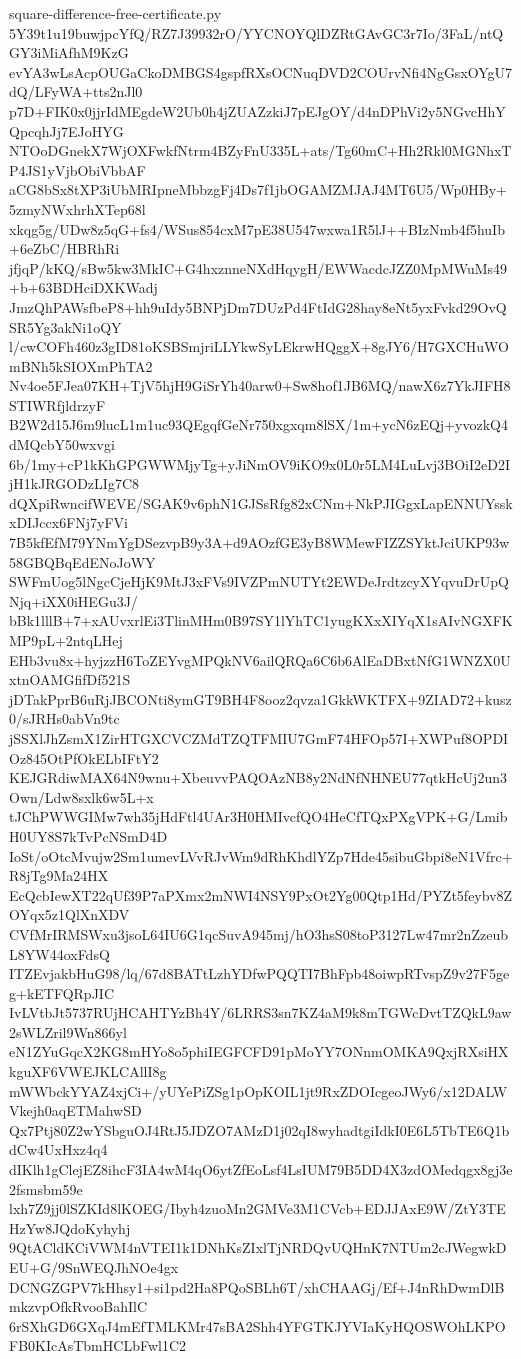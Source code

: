 \documentclass[11pt]{article}
\theoremstyle{definition}
\theoremstyle{remark}
\begin{document}
\begin{filecontents*}[overwrite]{square-difference-free-certificate.py}
5Y39t1u19buwjpcYfQ/RZ7J39932rO/YYCNOYQlDZRtGAvGC3r7Io/3FaL/ntQGY3iMiAfhM9KzG
evYA3wLsAcpOUGaCkoDMBGS4gspfRXsOCNuqDVD2COUrvNfi4NgGsxOYgU7dQ/LFyWA+tts2nJl0
p7D+FIK0x0jjrIdMEgdeW2Ub0h4jZUAZzkiJ7pEJgOY/d4nDPhVi2y5NGvcHhYQpcqhJj7EJoHYG
NTOoDGnekX7WjOXFwkfNtrm4BZyFnU335L+ats/Tg60mC+Hh2Rkl0MGNhxTP4JS1yVjbObiVbbAF
aCG8bSx8tXP3iUbMRIpneMbbzgFj4Ds7f1jbOGAMZMJAJ4MT6U5/Wp0HBy+5zmyNWxhrhXTep68l
xkqg5g/UDw8z5qG+fs4/WSus854cxM7pE38U547wxwa1R5lJ++BIzNmb4f5huIb+6eZbC/HBRhRi
jfjqP/kKQ/sBw5kw3MkIC+G4hxznneNXdHqygH/EWWacdcJZZ0MpMWuMs49+b+63BDHciDXKWadj
JmzQhPAWsfbeP8+hh9uIdy5BNPjDm7DUzPd4FtIdG28hay8eNt5yxFvkd29OvQSR5Yg3akNi1oQY
l/cwCOFh460z3gID81oKSBSmjriLLYkwSyLEkrwHQggX+8gJY6/H7GXCHuWOmBNh5kSIOXmPhTA2
Nv4oe5FJea07KH+TjV5hjH9GiSrYh40arw0+Sw8hof1JB6MQ/nawX6z7YkJIFH8STIWRfjldrzyF
B2W2d15J6m9lucL1m1uc93QEgqfGeNr750xgxqm8lSX/1m+ycN6zEQj+yvozkQ4dMQcbY50wxvgi
6b/1my+cP1kKhGPGWWMjyTg+yJiNmOV9iKO9x0L0r5LM4LuLvj3BOiI2eD2IjH1kJRGODzLIg7C8
dQXpiRwncifWEVE/SGAK9v6phN1GJSsRfg82xCNm+NkPJIGgxLapENNUYsskxDIJccx6FNj7yFVi
7B5kfEfM79YNmYgDSezvpB9y3A+d9AOzfGE3yB8WMewFIZZSYktJciUKP93w58GBQBqEdENoJoWY
SWFmUog5lNgcCjeHjK9MtJ3xFVs9IVZPmNUTYt2EWDeJrdtzcyXYqvuDrUpQNjq+iXX0iHEGu3J/
bBk1lllB+7+xAUvxrlEi3TlinMHm0B97SY1lYhTC1yugKXxXIYqX1sAIvNGXFKMP9pL+2ntqLHej
EHb3vu8x+hyjzzH6ToZEYvgMPQkNV6ailQRQa6C6b6AlEaDBxtNfG1WNZX0UxtnOAMGfifDf521S
jDTakPprB6uRjJBCONti8ymGT9BH4F8ooz2qvza1GkkWKTFX+9ZIAD72+kusz0/sJRHs0abVn9tc
jSSXlJhZsmX1ZirHTGXCVCZMdTZQTFMIU7GmF74HFOp57I+XWPuf8OPDIOz845OtPfOkELbIFtY2
KEJGRdiwMAX64N9wnu+XbeuvvPAQOAzNB8y2NdNfNHNEU77qtkHcUj2un3Own/Ldw8sxlk6w5L+x
tJChPWWGIMw7wh35jHdFtl4UAr3H0HMIvcfQO4HeCfTQxPXgVPK+G/LmibH0UY8S7kTvPcNSmD4D
IoSt/oOtcMvujw2Sm1umevLVvRJvWm9dRhKhdlYZp7Hde45sibuGbpi8eN1Vfrc+R8jTg9Ma24HX
EcQcbIewXT22qUf39P7aPXmx2mNWI4NSY9PxOt2Yg00Qtp1Hd/PYZt5feybv8ZOYqx5z1QlXnXDV
CVfMrIRMSWxu3jsoL64IU6G1qcSuvA945mj/hO3hsS08toP3127Lw47mr2nZzeubL8YW44oxFdsQ
ITZEvjakbHuG98/lq/67d8BATtLzhYDfwPQQTI7BhFpb48oiwpRTvspZ9v27F5geg+kETFQRpJIC
IvLVtbJt5737RUjHCAHTYzBh4Y/6LRRS3sn7KZ4aM9k8mTGWcDvtTZQkL9aw2sWLZril9Wn866yl
eN1ZYuGqcX2KG8mHYo8o5phiIEGFCFD91pMoYY7ONnmOMKA9QxjRXsiHXkguXF6VWEJKLCAllI8g
mWWbckYYAZ4xjCi+/yUYePiZSg1pOpKOIL1jt9RxZDOIcgeoJWy6/x12DALWVkejh0aqETMahwSD
Qx7Ptj80Z2wYSbguOJ4RtJ5JDZO7AMzD1j02qI8wyhadtgiIdkI0E6L5TbTE6Q1bdCw4UxHxz4q4
dIKlh1gClejEZ8ihcF3IA4wM4qO6ytZfEoLsf4LsIUM79B5DD4X3zdOMedqgx8gj3e2fsmsbm59e
lxh7Z9jj0lSZKId8lKOEG/Ibyh4zuoMn2GMVe3M1CVcb+EDJJAxE9W/ZtY3TEHzYw8JQdoKyhyhj
9QtACldKCiVWM4nVTEI1k1DNhKsZIxlTjNRDQvUQHnK7NTUm2cJWegwkDEU+G/9SnWEQJhNOe4gx
DCNGZGPV7kHhsy1+si1pd2Ha8PQoSBLh6T/xhCHAAGj/Ef+J4nRhDwmDlBmkzvpOfkRvooBahIlC
6rSXhGD6GXqJ4mEfTMLKMr47sBA2Shh4YFGTKJYVIaKyHQOSWOhLKPOFB0KIcAsTbmHCLbFwl1C2

\end{filecontents*}
\end{document}
